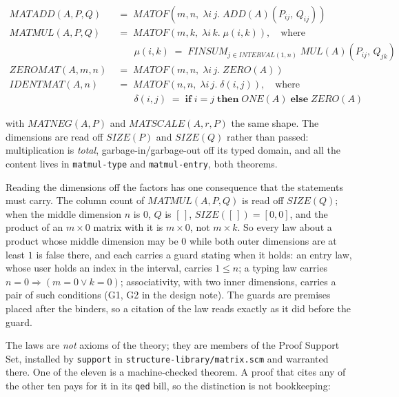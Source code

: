 \begin{align*}
\mathit{MATADD}(A, P, Q) &\;=\;
  \mathit{MATOF}(m, n,\; \lambda i\, j.\;
     \mathit{ADD}(A)(P_{ij},\, Q_{ij})) \\
\mathit{MATMUL}(A, P, Q) &\;=\;
  \mathit{MATOF}(m, k,\; \lambda i\, k.\; \mu(i,k)),
  \quad\text{where} \\
 &\qquad \mu(i,k) \;=\;
     \textstyle\mathit{FINSUM}_{j \in \mathit{INTERVAL}(1,n)}\;
     \mathit{MUL}(A)(P_{ij},\, Q_{jk}) \\
\mathit{ZEROMAT}(A, m, n) &\;=\;
  \mathit{MATOF}(m, n,\; \lambda i\, j.\; \mathit{ZERO}(A)) \\
\mathit{IDENTMAT}(A, n) &\;=\;
  \mathit{MATOF}(n, n,\; \lambda i\, j.\; \delta(i,j)),
  \quad\text{where} \\
 &\qquad \delta(i,j) \;=\;
     \mathbf{if}\; i = j \;\mathbf{then}\; \mathit{ONE}(A)
     \;\mathbf{else}\; \mathit{ZERO}(A)
\end{align*}

\noindent
with $\mathit{MATNEG}(A,P)$ and $\mathit{MATSCALE}(A,r,P)$ the same
shape.  The dimensions are read off $\mathit{SIZE}(P)$ and
$\mathit{SIZE}(Q)$ rather than passed: multiplication is
\emph{total}, garbage-in/garbage-out off its typed domain, and all the
content lives in \texttt{matmul-type} and \texttt{matmul-entry}, both
theorems.

Reading the dimensions off the factors has one consequence that the
statements must carry.  The column count of $\mathit{MATMUL}(A,P,Q)$ is
read off $\mathit{SIZE}(Q)$; when the middle dimension $n$ is $0$, $Q$
is $[\,]$, $\mathit{SIZE}([\,]) = [0,0]$, and the product of an
$m \times 0$ matrix with it is $m \times 0$, not $m \times k$.  So every
law about a product whose middle dimension may be $0$ while both outer
dimensions are at least $1$ is false there, and each carries a guard
stating when it holds: an entry law, whose user holds an index in the
interval, carries $1 \le n$; a typing law carries
$n = 0 \Rightarrow (m = 0 \vee k = 0)$; associativity, with two inner
dimensions, carries a pair of such conditions (G1, G2 in the design
note).  The guards are premises placed after the binders, so a citation
of the law reads exactly as it did before the guard.

The laws are \emph{not} axioms of the theory; they are members of the
Proof Support Set, installed by \texttt{support} in
\texttt{structure-library/matrix.scm} and warranted there.  One of the
eleven is a machine-checked theorem.  A proof that cites any of the
other ten pays for it in its \texttt{qed} bill, so the distinction is
not bookkeeping:

